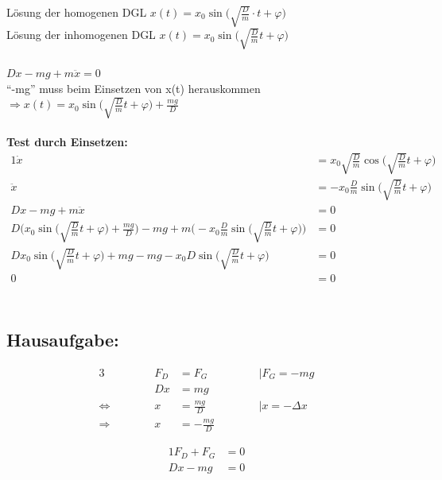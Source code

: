 \documentclass{article}
\begin{document}
	\newpage
	\noindent
	Lösung der homogenen DGL \qquad $x(t) = x_0 \sin \Big( \sqrt{\frac{D}{m}} \cdot t + \varphi \Big)$\\
	Lösung der inhomogenen DGL \qquad $x(t) = x_0 \sin \Big( \sqrt{\frac{D}{m}} t + \varphi \Big)$\\
	\\
	$Dx - mg + m \ddot{x} = 0$\\
	``-mg'' muss beim Einsetzen von x(t) herauskommen\\
	$\Rightarrow x(t) = x_0 \sin \Big( \sqrt{\frac{D}{m}} t + \varphi \Big) + \frac{mg}{D}$\\
	\\
	\textbf{Test durch Einsetzen:}\\
	\begin{alignat}{1}
		\dot{x}&=x_0\sqrt{\tfrac Dm}\cos \Big(\sqrt{\tfrac Dm}t+\varphi \Big)\\
		\ddot{x}&=-x_0\frac Dm \sin \Big( \sqrt{\tfrac Dm}t+\varphi \Big)\\
		Dx-mg+m\ddot{x}&=0\\
		D\Big(x_0 \sin \Bigg( \sqrt{\tfrac Dm}t+\varphi \Bigg)+\frac{mg}D \Big)-mg+m \Big(-x_0\frac D m \sin \Bigg(\sqrt{\frac Dm}t+\varphi\Bigg) \Big)&=0\\
		Dx_0 \sin \Big(\sqrt{\tfrac Dm}t+\varphi \Big)+mg-mg-x_0D \sin \Big(\sqrt{\tfrac Dm}t+\varphi \Big)&=0\\
		0&=0\\
	\end{alignat}
	\vspace{0.5cm}\\
	\subsection{Hausaufgabe:}
	\vspace{-0.3cm}
	\begin{minipage}[htpb]{0.6\textwidth}
		\vspace{0pt}
		\begin{alignat}{3}
			& \hspace{1cm} & F_D &= F_G              &\hspace{1cm}& \mid F_G = -mg\\
			&            & D x &= mg               &      & \\
			\Leftrightarrow &  & x   &= \frac{mg}{D}     && \mid x = -\Delta x\\
			\Rightarrow &      & x   &= -\frac{mg}{D}    &      &
		\end{alignat}
	\end{minipage}
	\hfill
	\begin{minipage}[b]{0.4\textwidth}
		\vspace{0pt}
		\begin{alignat}{1}
			F_D + F_G &= 0\\
			D x - m g &= 0
		\end{alignat}
	\end{minipage}
	\vspace{0.3cm}
\end{document}

